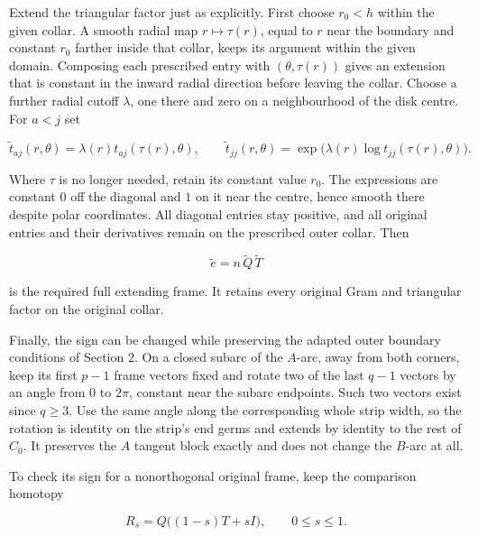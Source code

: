 Extend the triangular factor just as explicitly. First choose \(r_0<h\) within the given collar. A smooth radial map \(r\mapsto\tau(r)\), equal to \(r\) near the boundary and constant \(r_0\) farther inside that collar, keeps its argument within the given domain. Composing each prescribed entry with \((\theta,\tau(r))\) gives an extension that is constant in the inward radial direction before leaving the collar. Choose a further radial cutoff \(\lambda\), one there and zero on a neighbourhood of the disk centre. For \(a<j\) set

\begin{equation}
\widetilde t_{aj}(r,\theta)=\lambda(r)t_{aj}(\tau(r),\theta),
 \qquad
 \widetilde t_{jj}(r,\theta)
   =\exp\bigl(\lambda(r)\log t_{jj}(\tau(r),\theta)\bigr).
 \label{courseIII:whitney-moves-in-the-receiving-dimensions:eq:3.9}
\end{equation}

Where \(\tau\) is no longer needed, retain its constant value \(r_0\). The expressions are constant \(0\) off the diagonal and \(1\) on it near the centre, hence smooth there despite polar coordinates. All diagonal entries stay positive, and all original entries and their derivatives remain on the prescribed outer collar. Then

\begin{equation}
\widetilde e=n\,\widetilde Q\,\widetilde T
 \label{courseIII:whitney-moves-in-the-receiving-dimensions:eq:3.10}
\end{equation}

is the required full extending frame. It retains every original Gram and triangular factor on the original collar.

Finally, the sign can be changed while preserving the adapted outer boundary conditions of Section 2. On a closed subarc of the \(A\)-arc, away from both corners, keep its first \(p-1\) frame vectors fixed and rotate two of the last \(q-1\) vectors by an angle from \(0\) to \(2\pi\), constant near the subarc endpoints. Such two vectors exist since \(q\geq3\). Use the same angle along the corresponding whole strip width, so the rotation is identity on the strip's end germs and extends by identity to the rest of \(C_0\). It preserves the \(A\) tangent block exactly and does not change the \(B\)-arc at all.

To check its sign for a nonorthogonal original frame, keep the comparison homotopy

\begin{equation}
R_s=Q\bigl((1-s)T+sI\bigr),\qquad 0\leq s\leq1.
 \label{courseIII:whitney-moves-in-the-receiving-dimensions:eq:3.11}
\end{equation}

